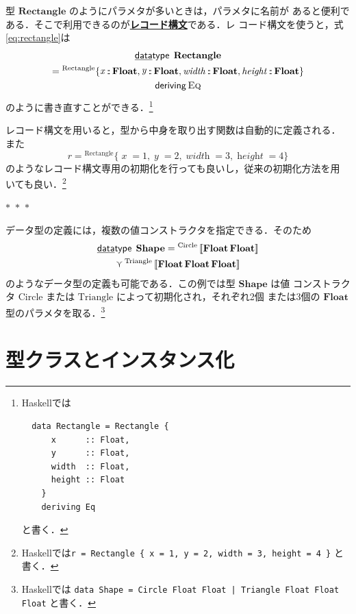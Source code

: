 \documentclass[a5paper,twoside,fleqn,draft]{jsbook}
\def\[{\left[\!\left[}
\def\]{\right]\!\right]}
\newcommand{\separator}{\begin{center}$*$~$*$~$*$\end{center}}
\newcommand{\programminglanguage}[1]{\textsf{#1}}
\newcommand{\haskell}{\programminglanguage{Haskell}}
\newcommand{\keyword}[1]{{\underline{\textbf{#1}}}}
\newcommand{\code}[1]{\texttt{#1}}
\newcommand{\mKeyword}[1]{\mathsf{#1}} %
\newcommand{\mKeywordUnderline}[1]{\text{\underline{\textsf{#1}}}} %
\newcommand{\mDataTypeKeyword}{\mKeywordUnderline{data}\mKeyword{type}}
\newcommand{\mDerivingKeyword}{\mKeyword{deriving}}
\DeclareMathOperator{\mDataType}{\mDataTypeKeyword}
\DeclareMathOperator{\mDeriving}{\mDerivingKeyword}
\newcommand{\mFunc}[1]{\mathop{\mathit{#1}}}
\DeclareMathOperator{\mIn}{{:\!:}}
\DeclareMathOperator{\mValueOr}{\curlyvee}
\newcommand{\mType}[1]{\mathbf{#1}}
\newcommand{\mFloatType}{\mType{Float}}
\newcommand{\mValueConstructor}[1]{\mathrm{#1}}
\newcommand{\mGenericValueAssemble}[2]{{}^\mValueConstructor{#1}\[#2\]}
\newcommand{\mGenericRecordWith}[2]{{}^\mValueConstructor{#1}\{#2\}}
\newcommand{\mGenericRecordBeginWith}[1]{{}^\mValueConstructor{#1}\{}
\newcommand{\mGenericRecordEnd}{\}}
\newcommand{\mGenericTypeClass}[1]{\textsc{#1}} %
\newcommand{\mEqTypeClass}{\mGenericTypeClass{Eq}}
\begin{document}
型 $\mType{Rectangle}$ のようにパラメタが多いときは，パラメタに名前が
あると便利である．そこで利用できるのが\keyword{レコード構文}である．レ
コード構文を使うと，式\eqref{eq:rectangle}は
\begin{multline}
  \mDataType\;\mType{Rectangle}\\
  =\mGenericRecordBeginWith{Rectangle}
  \mFunc{x}\mIn\mFloatType,
  \mFunc{y}\mIn\mFloatType,
  \mFunc{width}\mIn\mFloatType,
  \mFunc{height}\mIn\mFloatType
  \mGenericRecordEnd\\
  \mDeriving\mEqTypeClass
\end{multline}
のように書き直すことができる．\footnote{\haskell では
\begin{verbatim}
  data Rectangle = Rectangle {
      x      :: Float,
      y      :: Float,
      width  :: Float,
      height :: Float
    }
    deriving Eq
\end{verbatim}
と書く．}

レコード構文を用いると，型から中身を取り出す関数は自動的に定義される．
また
\begin{equation}
r=\mGenericRecordWith{Rectangle}{\mFunc{x}=1,
  \mFunc{y}=2,
  \mFunc{width}=3,
  \mFunc{height}=4}
\end{equation}
のようなレコード構文専用の初期化を行っても良いし，従来の初期化方法を用
いても良い．\footnote{\haskell では\code{r = Rectangle \{ x = 1, y =
    2, width = 3, height = 4 \}} と書く．}

\separator

データ型の定義には，複数の値コンストラクタを指定できる．そのため
\begin{multline}
\mDataType\;\mType{Shape}
=\mGenericValueAssemble{Circle}{\mFloatType\,\mFloatType}\\
\mValueOr
\mGenericValueAssemble{Triangle}{\mFloatType\,\mFloatType\,\mFloatType}
\end{multline}
のようなデータ型の定義も可能である．この例では型 $\mType{Shape}$ は値
コンストラクタ $\mValueConstructor{Circle}$ または
$\mValueConstructor{Triangle}$ によって初期化され，それぞれ2個
または3個の $\mFloatType$ 型のパラメタを取る．\footnote{\haskell では
\code{data Shape = Circle Float Float | Triangle Float Float Float}
と書く．}

\section{型クラスとインスタンス化}
\label{sec:type-class-and-instance}
\end{document}

